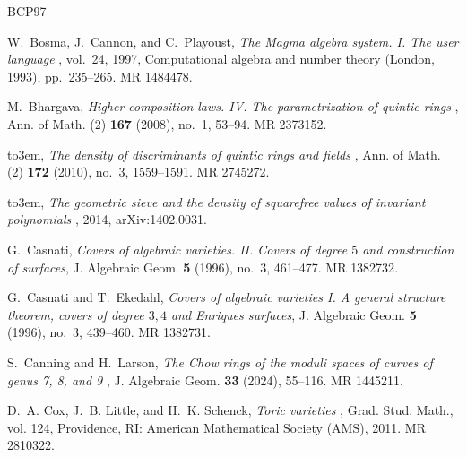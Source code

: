 \documentclass[11pt]{amsart}
\numberwithin{theorem}{section}
\numberwithin{equation}{section}
\theoremstyle{definition}\newtheorem{defn}[theorem]{Definition}
\theoremstyle{definition}\newtheorem{remark}[theorem]{Remark}
\theoremstyle{definition}\newtheorem{question}[theorem]{Question}
\theoremstyle{definition}\newtheorem{problem}[theorem]{Problem}
\begin{document}
\begingroup
\hypersetup{
  urlcolor=mybiburlcolor
}
\providecommand{\bysame}{\leavevmode\hbox to3em{\hrulefill}\thinspace}
\providecommand{\MR}{\relax\ifhmode\unskip\space\fi MR }
\providecommand{\MRhref}[2]{%
  \href{http://www.ams.org/mathscinet-getitem?mr=#1}{#2}
}
\providecommand{\bibtitleref}[2]{%
  \hypersetup{urlbordercolor=0.8 1 1}%
  \href{#1}{#2}%
  \hypersetup{urlbordercolor=cyan}%
}
\providecommand{\href}[2]{#2}
\begin{thebibliography}{BCP97}

W.~Bosma, J.~Cannon, and C.~Playoust, \bibtitleref{https://doi.org/10.1006/jsco.1996.0125}{\emph{The {M}agma algebra system. {I}. {T}he user language}}, vol.~24, 1997, Computational algebra and number theory (London, 1993), pp.~235--265. \MR{1484478}.

M.~Bhargava, \bibtitleref{https://doi.org/10.4007/annals.2008.167.53}{\emph{Higher composition laws. {IV}. {T}he parametrization of quintic rings}}, Ann. of Math. (2) \textbf{167} (2008), no.~1, 53--94. \MR{2373152}.

\bysame, \bibtitleref{https://doi.org/10.4007/annals.2010.172.1559}{\emph{The density of discriminants of quintic rings and fields}}, Ann. of Math. (2) \textbf{172} (2010), no.~3, 1559--1591. \MR{2745272}.

\bysame, \bibtitleref{https://arxiv.org/abs/1402.0031}{\emph{The geometric sieve and the density of squarefree values of invariant polynomials}}, 2014, arXiv:1402.0031.

G.~Casnati, \emph{Covers of algebraic varieties. {II}. {C}overs of degree {$5$} and construction of surfaces}, J. Algebraic Geom. \textbf{5} (1996), no.~3, 461--477. \MR{1382732}.

G.~Casnati and T.~Ekedahl, \emph{Covers of algebraic varieties {I}. {A} general structure theorem, covers of degree {$3,4$} and {E}nriques surfaces}, J. Algebraic Geom. \textbf{5} (1996), no.~3, 439--460. \MR{1382731}.

S.~Canning and H.~Larson, \bibtitleref{https://doi.org/10.1090/jag/818}{\emph{The {C}how rings of the moduli spaces of curves of genus 7, 8, and 9}}, J. Algebraic Geom. \textbf{33} (2024), 55--116. \MR{1445211}.

D.~A. Cox, J.~B. Little, and H.~K. Schenck, \bibtitleref{https://doi.org/10.1090/gsm/124}{\emph{Toric varieties}}, Grad. Stud. Math., vol. 124, Providence, RI: American Mathematical Society (AMS), 2011. \MR{2810322}.


\end{thebibliography}
\end{document}
